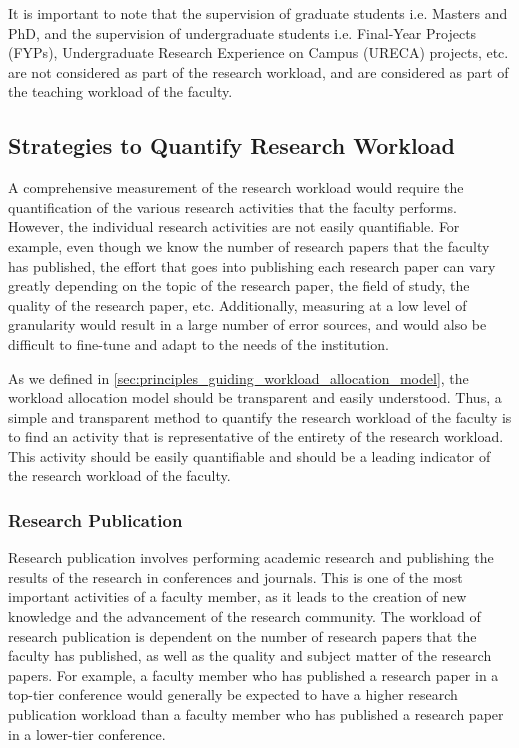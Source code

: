 It is important to note that the supervision of graduate students i.e. Masters and PhD, and the supervision of undergraduate students i.e. Final-Year Projects (FYPs), Undergraduate Research Experience on Campus (URECA) projects, etc. are not considered as part of the research workload, and are considered as part of the teaching workload of the faculty.

\subsection{Strategies to Quantify Research Workload}

A comprehensive measurement of the research workload would require the quantification of the various research activities that the faculty performs. However, the individual research activities are not easily quantifiable. For example, even though we know the number of research papers that the faculty has published, the effort that goes into publishing each research paper can vary greatly depending on the topic of the research paper, the field of study, the quality of the research paper, etc. Additionally, measuring at a low level of granularity would result in a large number of error sources, and would also be difficult to fine-tune and adapt to the needs of the institution.

As we defined in \autoref{sec:principles_guiding_workload_allocation_model}, the workload allocation model should be transparent and easily understood. Thus, a simple and transparent method to quantify the research workload of the faculty is to find an activity that is representative of the entirety of the research workload. This activity should be easily quantifiable and should be a leading indicator of the research workload of the faculty.


\subsubsection{Research Publication}

Research publication involves performing academic research and publishing the results of the research in conferences and journals. This is one of the most important activities of a faculty member, as it leads to the creation of new knowledge and the advancement of the research community. The workload of research publication is dependent on the number of research papers that the faculty has published, as well as the quality and subject matter of the research papers. For example, a faculty member who has published a research paper in a top-tier conference would generally be expected to have a higher research publication workload than a faculty member who has published a research paper in a lower-tier conference.

